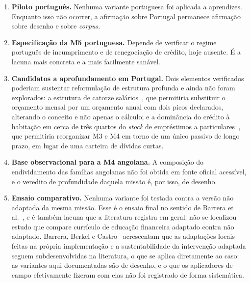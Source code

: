 \begin{enumerate}
\item[(a)] \textbf{Piloto português.} Nenhuma variante portuguesa foi aplicada a aprendizes. Enquanto isso não ocorrer, a afirmação sobre Portugal permanece afirmação sobre desenho e sobre \textit{corpus}.

\item[(b)] \textbf{Especificação da M5 portuguesa.} Depende de verificar o regime português de incumprimento e de renegociação de crédito, hoje ausente. É a lacuna mais concreta e a mais facilmente sanável.

\item[(c)] \textbf{Candidatos a aprofundamento em Portugal.} Dois elementos verificados poderiam sustentar reformulação de estrutura profunda e ainda não foram explorados: a estrutura de catorze salários~\cite{ct2009}, que permitiria substituir o orçamento mensal por um orçamento anual com dois picos declarados, alterando o conceito e não apenas o cálculo; e a dominância do crédito à habitação em cerca de três quartos do \textit{stock} de empréstimos a particulares~\cite{leitao2025}, que permitiria reorganizar M3 e M4 em torno de um único passivo de longo prazo, em lugar de uma carteira de dívidas curtas.

\item[(d)] \textbf{Base observacional para a M4 angolana.} A composição do endividamento das famílias angolanas não foi obtida em fonte oficial acessível, e o veredito de profundidade daquela missão é, por isso, de desenho.

\item[(e)] \textbf{Ensaio comparativo.} Nenhuma variante foi testada contra a versão não adaptada da mesma missão. Esse é o ensaio final no sentido de Barrera et al.~\cite{barrera2013}, e é também lacuna que a literatura registra em geral: não se localizou estudo que compare currículo de educação financeira adaptado contra não adaptado. Barrera, Berkel e Castro~\cite{barrera2017} acrescentam que as adaptações locais feitas na própria implementação e a sustentabilidade da intervenção adaptada seguem subdesenvolvidas na literatura, o que se aplica diretamente ao caso: as variantes aqui documentadas são de desenho, e o que os aplicadores de campo efetivamente fizeram com elas não foi registrado de forma sistemática.
\end{enumerate}


